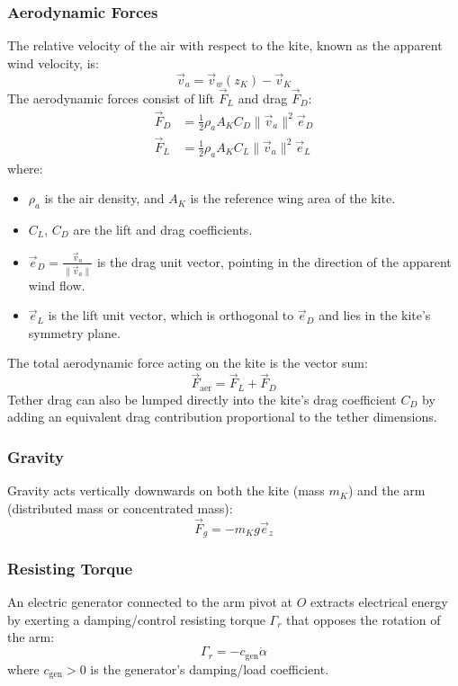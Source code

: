 \documentclass{article}
\begin{document}
\subsubsection{Aerodynamic Forces}
The relative velocity of the air with respect to the kite, known as the apparent wind velocity, is:
\begin{equation}
\vec{v}_a = \vec{v}_w(z_K) - \vec{v}_K
\end{equation}
The aerodynamic forces consist of lift $\vec{F}_L$ and drag $\vec{F}_D$:
\begin{align}
\vec{F}_D &= \frac{1}{2} \rho_a A_K C_D \|\vec{v}_a\|^2 \vec{e}_D \\
\vec{F}_L &= \frac{1}{2} \rho_a A_K C_L \|\vec{v}_a\|^2 \vec{e}_L
\end{align}
where:
\begin{itemize}
    \item $\rho_a$ is the air density, and $A_K$ is the reference wing area of the kite.
    \item $C_L$, $C_D$ are the lift and drag coefficients.
    \item $\vec{e}_D = \frac{\vec{v}_a}{\|\vec{v}_a\|}$ is the drag unit vector, pointing in the direction of the apparent wind flow.
    \item $\vec{e}_L$ is the lift unit vector, which is orthogonal to $\vec{e}_D$ and lies in the kite's symmetry plane.
\end{itemize}
The total aerodynamic force acting on the kite is the vector sum:
\begin{equation}
\vec{F}_{\text{aer}} = \vec{F}_L + \vec{F}_D
\end{equation}
Tether drag can also be lumped directly into the kite's drag coefficient $C_D$ by adding an equivalent drag contribution proportional to the tether dimensions.

\subsubsection{Gravity}
Gravity acts vertically downwards on both the kite (mass $m_K$) and the arm (distributed mass or concentrated mass):
\begin{equation}
\vec{F}_g = -m_K g \vec{e}_z
\end{equation}

\subsubsection{Resisting Torque}
An electric generator connected to the arm pivot at $O$ extracts electrical energy by exerting a damping/control resisting torque $\Gamma_r$ that opposes the rotation of the arm:
\begin{equation}
\Gamma_r = -c_{\text{gen}} \dot{\alpha}
\end{equation}
where $c_{\text{gen}} > 0$ is the generator's damping/load coefficient.
\end{document}
